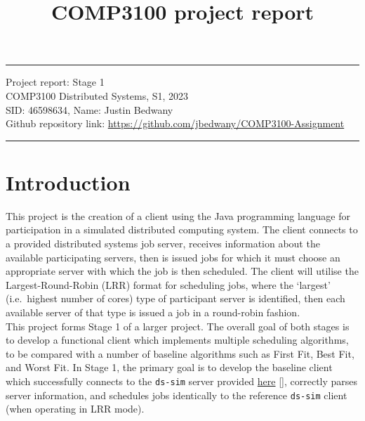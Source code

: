 \documentclass[a4paper]{article} %
\begin{document}

\title{COMP3100 project report} %
\fancyhead[C]{}
\hrule \medskip %
\begin{minipage}{1\textwidth} %
\centering 
\large %
Project report: Stage 1\\ %
COMP3100 Distributed Systems, S1, 2023\\
\normalsize %
SID\@: 46598634, Name: Justin Bedwany\\
Github repository link: \url{https://github.com/jbedwany/COMP3100-Assignment}
\end{minipage}
\medskip\hrule %
\bigskip

\section{Introduction} %
This project is the creation of a client using the Java programming language for participation in a simulated distributed computing system. The client connects to a provided distributed systems job server, receives 
information about the available participating servers, then is issued jobs for which it must choose an appropriate server with which the job is then scheduled. The client will utilise the Largest-Round-Robin (LRR) format 
for scheduling jobs, where the `largest' (i.e.\ highest number of cores) type of participant server is identified, then each available server of that type is issued a job in a round-robin fashion.\\

This project forms Stage 1 of a larger project. The overall goal of both stages is to develop a functional client which implements multiple scheduling algorithms, to be compared with a number of baseline algorithms 
such as First Fit,  Best Fit, and Worst Fit. In Stage 1, the primary goal is to develop the baseline client which successfully connects to the \texttt{ds-sim} server provided 
\href{https://github.com/distsys-MQ/ds-sim}{here} [], correctly parses server information, and schedules jobs identically to the reference \texttt{ds-sim} client (when operating in LRR mode). 
\end{document}

